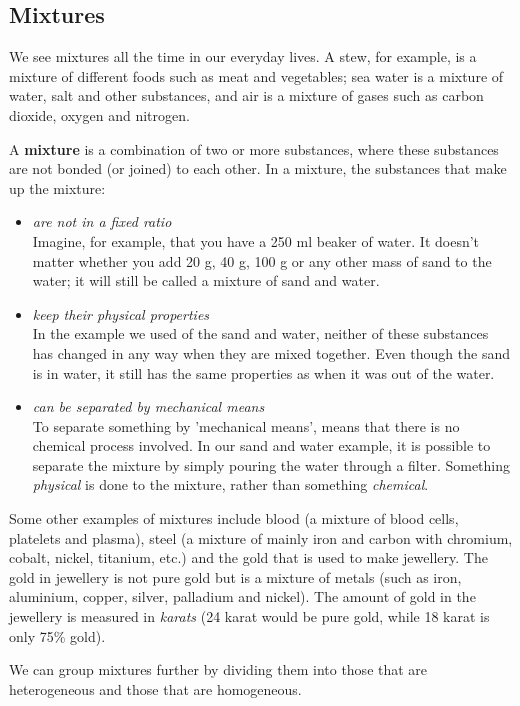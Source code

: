             \subsection{ Mixtures}
            \nopagebreak
            \label{m38708*id62584}We see mixtures all the time in our everyday lives. A stew, for example, is a mixture of different foods such as meat and vegetables; sea water is a mixture of water, salt and other substances, and air is a mixture of gases such as carbon dioxide, oxygen and nitrogen.\par 
\label{m38708*fhsst!!!underscore!!!id69}
 {\label{m38708*meaningfhsst!!!underscore!!!id69}
      A \textbf{mixture} is a combination of two or more substances, where these substances are not bonded (or joined) to each other. 
       } 
      \label{m38708*id62612}In a mixture, the substances that make up the mixture:\par 
      \label{m38708*id62615}\begin{itemize}[noitemsep]
            \label{m38708*uid2}\item \textsl{are not in a fixed ratio} \\
Imagine, for example, that you have a 250 ml beaker of water. It doesn't matter whether you add 20 g, 40 g, 100 g or any other mass of sand to the water; it will still be called a mixture of sand and water.
\label{m38708*uid3}\item \textsl{keep their physical properties} \\
In the example we used of the sand and water, neither of these substances has changed in any way when they are mixed together. Even though the sand is in water, it still has the same properties as when it was out of the water.
\label{m38708*uid4}\item \textsl{can be separated by mechanical means} \\
To separate something by 'mechanical means', means that there is no chemical process involved. In our sand and water example, it is possible to separate the mixture by simply pouring the water through a filter. Something \textsl{physical} is done to the mixture, rather than something \textsl{chemical}.
\end{itemize}
      \label{m38708*id62689}Some other examples of mixtures include blood (a mixture of blood cells, platelets and plasma), steel (a mixture of mainly iron and carbon with chromium, cobalt, nickel, titanium, etc.) and the gold that is used to make jewellery. The gold in jewellery is not pure gold but is a mixture of metals (such as iron, aluminium, copper, silver, palladium and nickel). The amount of gold in the jewellery is measured in \textsl{karats} (24 karat would be pure gold, while 18 karat is only 75\% gold).\par 
      \label{m38708*id62700}We can group mixtures further by dividing them into those that are heterogeneous and those that are homogeneous.\par 
      \label{m38708*uid5}
